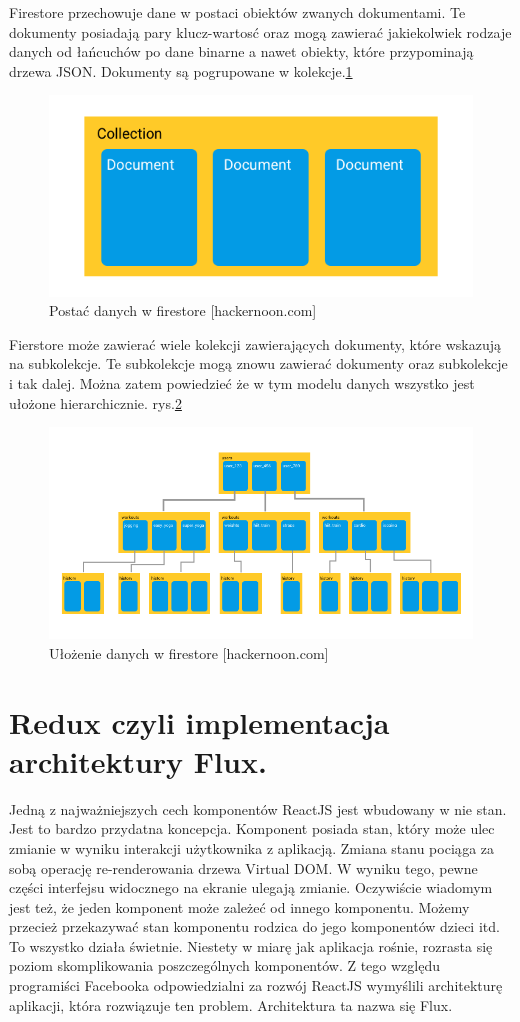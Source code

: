Firestore przechowuje dane w postaci obiektów zwanych dokumentami.
Te dokumenty posiadają pary klucz-wartosć oraz mogą zawierać jakiekolwiek rodzaje danych od łańcuchów po dane binarne a nawet obiekty,
które przypominają drzewa JSON\@. Dokumenty są pogrupowane w kolekcje.\ref{rys:firestoreData}

\begin{figure}
	\centering\includegraphics[width=.6\textwidth]{img/firestoreData}
	\caption{Postać danych w firestore [hackernoon.com]}\label{rys:firestoreData}%
\end{figure}

Fierstore może zawierać wiele kolekcji zawierających dokumenty, które wskazują na subkolekcje.
Te subkolekcje mogą znowu zawierać dokumenty oraz subkolekcje i tak dalej.
Można zatem powiedzieć że w tym modelu danych wszystko jest ułożone hierarchicznie.\cite{www_hakermoon}
rys.\ref{rys:firestoreTree}

\begin{figure}
	\centering\includegraphics[width=.6\textwidth]{img/firestoreTree}
	\caption{Ułożenie danych w firestore [hackernoon.com]}\label{rys:firestoreTree}%
\end{figure}

\section{Redux czyli implementacja architektury Flux.}

Jedną z najważniejszych cech komponentów ReactJS jest wbudowany w nie stan.
Jest to bardzo przydatna koncepcja. Komponent posiada stan,
który może ulec zmianie w wyniku interakcji użytkownika z aplikacją.
Zmiana stanu pociąga za sobą operację re-renderowania drzewa Virtual DOM\@.
W wyniku tego, pewne części interfejsu widocznego na ekranie ulegają zmianie.
Oczywiście wiadomym jest też, że jeden komponent może zależeć od innego komponentu.
Możemy przecież przekazywać stan komponentu rodzica do jego komponentów dzieci itd.
To wszystko działa świetnie. Niestety w miarę jak aplikacja rośnie, rozrasta się poziom skomplikowania poszczególnych komponentów.
Z tego względu programiści Facebooka odpowiedzialni za rozwój ReactJS wymyślili architekturę aplikacji, która rozwiązuje ten problem.
Architektura ta nazwa się Flux.\cite{www_nafrontendzie}

